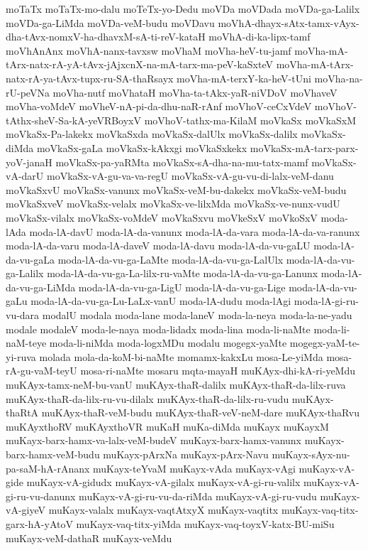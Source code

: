 {moTaTx
moTaTx-mo-dalu
moTeTx-yo-Dedu
moVDa
moVDada
moVDa-ga-Lalilx
moVDa-ga-LiMda
moVDa-veM-budu
moVDavu
moVhA-dhayx-sAtx-tamx-vAyx-dha-tAvx-nomxV-ha-dhavxM-sA-ti-reV-kataH
moVhA-di-ka-lipx-tamf
moVhAnAnx
moVhA-nanx-tavxsw
moVhaM
moVha-heV-tu-jamf
moVha-mA-tArx-natx-rA-yA-tAvx-jAjxcnX-na-mA-tarx-ma-peV-kaSxteV
moVha-mA-tArx-natx-rA-ya-tAvx-tupx-ru-SA-thaRsayx
moVha-mA-terxY-ka-heV-tUni
moVha-na-rU-peVNa
moVha-nutf
moVhataH
moVha-ta-tAkx-yaR-niVDoV
moVhaveV
moVha-voMdeV
moVheV-nA-pi-da-dhu-naR-rAnf
moVhoV-ceCxVdeV
moVhoV-tAthx-sheV-Sa-kA-yeVRBoyxV
moVhoV-tathx-ma-KilaM
moVkaSx
moVkaSxM
moVkaSx-Pa-lakekx
moVkaSxda
moVkaSx-dalUlx
moVkaSx-dalilx
moVkaSx-diMda
moVkaSx-gaLa
moVkaSx-kAkxgi
moVkaSxkekx
moVkaSx-mA-tarx-parx-yoV-janaH
moVkaSx-pa-yaRMta
moVkaSx-sA-dha-na-mu-tatx-mamf
moVkaSx-vA-darU
moVkaSx-vA-gu-va-va-regU
moVkaSx-vA-gu-vu-di-lalx-veM-danu
moVkaSxvU
moVkaSx-vanunx
moVkaSx-veM-bu-dakekx
moVkaSx-veM-budu
moVkaSxveV
moVkaSx-velalx
moVkaSx-ve-lilxMda
moVkaSx-ve-nunx-vudU
moVkaSx-vilalx
moVkaSx-voMdeV
moVkaSxvu
moVkeSxV
moVkoSxV
moda-lAda
moda-lA-davU
moda-lA-da-vanunx
moda-lA-da-vara
moda-lA-da-va-ranunx
moda-lA-da-varu
moda-lA-daveV
moda-lA-davu
moda-lA-da-vu-gaLU
moda-lA-da-vu-gaLa
moda-lA-da-vu-ga-LaMte
moda-lA-da-vu-ga-LalUlx
moda-lA-da-vu-ga-Lalilx
moda-lA-da-vu-ga-La-lilx-ru-vaMte
moda-lA-da-vu-ga-Lanunx
moda-lA-da-vu-ga-LiMda
moda-lA-da-vu-ga-LigU
moda-lA-da-vu-ga-Lige
moda-lA-da-vu-gaLu
moda-lA-da-vu-ga-Lu-LaLx-vanU
moda-lA-dudu
moda-lAgi
moda-lA-gi-ru-vu-dara
modalU
modala
moda-lane
moda-laneV
moda-la-neya
moda-la-ne-yadu
modale
modaleV
moda-le-naya
moda-lidadx
moda-lina
moda-li-naMte
moda-li-naM-teye
moda-li-niMda
moda-logxMDu
modalu
mogegx-yaMte
mogegx-yaM-te-yi-ruva
molada
mola-da-koM-bi-naMte
momamx-kakxLu
mosa-Le-yiMda
mosa-rA-gu-vaM-teyU
mosa-ri-naMte
mosaru
mqta-mayaH
muKAyx-dhi-kA-ri-yeMdu
muKAyx-tamx-neM-bu-vanU
muKAyx-thaR-dalilx
muKAyx-thaR-da-lilx-ruva
muKAyx-thaR-da-lilx-ru-vu-dilalx
muKAyx-thaR-da-lilx-ru-vudu
muKAyx-thaRtA
muKAyx-thaR-veM-budu
muKAyx-thaR-veV-neM-dare
muKAyx-thaRvu
muKAyxthoRV
muKAyxthoVR
muKaH
muKa-diMda
muKayx
muKayxM
muKayx-barx-hamx-va-lalx-veM-budeV
muKayx-barx-hamx-vanunx
muKayx-barx-hamx-veM-budu
muKayx-pArxNa
muKayx-pArx-Navu
muKayx-sAyx-nu-pa-saM-hA-rAnanx
muKayx-teYvaM
muKayx-vAda
muKayx-vAgi
muKayx-vA-gide
muKayx-vA-gidudx
muKayx-vA-gilalx
muKayx-vA-gi-ru-valilx
muKayx-vA-gi-ru-vu-danunx
muKayx-vA-gi-ru-vu-da-riMda
muKayx-vA-gi-ru-vudu
muKayx-vA-giyeV
muKayx-valalx
muKayx-vaqtAtxyX
muKayx-vaqtitx
muKayx-vaq-titx-garx-hA-yAtoV
muKayx-vaq-titx-yiMda
muKayx-vaq-toyxV-katx-BU-miSu
muKayx-veM-dathaR
muKayx-veMdu
}
